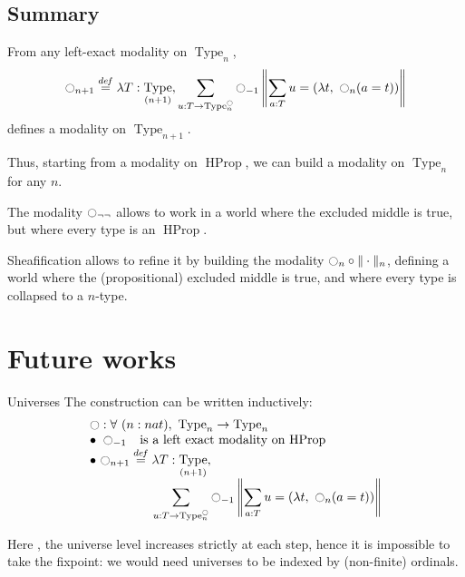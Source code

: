 \documentclass{beamer}
\newcommand \defeq {\overset{de\hspace{-0.2ex}f}{=}}
\DeclareMathOperator{\Type}{Type}
\DeclareMathOperator{\HProp}{HProp}
\newcommand{\modal}{\ensuremath{\ocircle}}
\newcommand{\nType}[1]{\Type_{#1}}
\begin{document}
\subsection{Summary}
\label{sec:consequences}

\begin{frame}
  From any left-exact modality on $\Type_n$,
  \[\displaystyle{\modal_{n+1} \defeq  \lambda T:\nType {(n+1)}},
  \sum_{u:T \to \nType n^\modal} \modal_{-1} 
  \left\|
    \sum_{a:T} u= (\lambda t,~\modal_n (a=t))
  \right\|\]
  defines a modality on $\Type_{n+1}$.

  \bigskip

  Thus, starting from a modality on $\HProp$, we can build a modality
  on $\Type_n$ for any $n$.
\end{frame}

\begin{frame}

  \note{ }
  The modality $\modal_{\lnot\lnot}$ allows to work in a world where the
  excluded middle is true, but where every type is an $\HProp$.

  \bigskip

  Sheafification allows to refine it by building the modality $\modal_n \circ \|\cdot
  \|_n$, defining a world where the (propositional) excluded middle is true, and
  where every type is collapsed to a $n$-type.


\end{frame}

\section{Future works}
\label{sec:fw}
\begin{frame}{Universes}
  The construction can be written inductively:
  \[ \begin{array}{l}
    \modal : \forall \ (n : nat), \ \nType n \to \nType n 
    \\
    \bullet~\modal_{-1\phantom{n}} \text{ is a left exact modality on
      $\HProp$} \\
    \bullet~\displaystyle{\modal_{n+1} \defeq  \lambda T:\nType {(n+1)}},\\
    \hspace{5em} \displaystyle{\sum_{u:T \to \nType n^\modal} \modal_{-1} 
      \left\|
        \sum_{a:T} u= (\lambda t,~\modal_n (a=t))
      \right\|}
  \end{array}
  \]

  Here , the universe level increases strictly at each step, hence it is
  impossible to take the fixpoint: we would need universes to be
  indexed by (non-finite) ordinals.

\end{frame}
\end{document}
